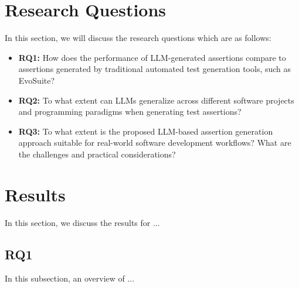 \section{Research Questions}
\label{sec:research_questions}
\vspace{0.2 cm}

In this section, we will discuss the research questions which are as follows:
\begin{itemize}
    \item \textbf{RQ1:} How does the performance of LLM-generated assertions compare to assertions generated by traditional automated test generation tools, such as EvoSuite?

    \item \textbf{RQ2:} To what extent can LLMs generalize across different software projects and programming paradigms when generating test assertions?
    
    \item \textbf{RQ3:} To what extent is the proposed LLM-based assertion generation approach suitable for real-world software development workflows? What are the challenges and practical considerations?
\end{itemize}

\section{Results}
\label{sec:results}
\vspace{0.2 cm}

In this section, we discuss the results for ... 

\vspace{0.1 cm}
\subsection{RQ1}
\label{sec:results_rq1}
\vspace{0.1 cm}

In this subsection, an overview of ...




